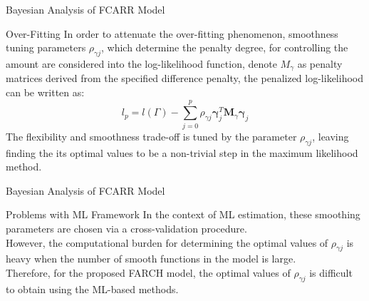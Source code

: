 \documentclass{beamer}
\begin{document}
\begin{frame}{Bayesian Analysis of FCARR Model}
\begin{block}{Over-Fitting}
In order to attenuate the over-fitting phenomenon, smoothness tuning parameters $\rho_{\gamma j}$, which determine the penalty degree, for controlling the amount are considered into the log-likelihood function, denote $M_{\gamma}$ as penalty matrices derived from the specified difference penalty, the penalized log-likelihood can be written as:
\begin{equation}
     l_p = l(\Gamma) - \sum_{j=0}^p \rho_{\gamma j} \bm{\gamma}_j^T \bm{M}_ \gamma \bm{\gamma}_j
\end{equation}
The flexibility and smoothness trade-off is tuned by the parameter $\rho_{\gamma j}$, leaving finding the its optimal values to be a non-trivial step in the maximum likelihood method.
\end{block}
\end{frame}

\begin{frame}{Bayesian Analysis of FCARR Model}
\begin{block}{Problems with ML Framework}
In the context of ML estimation, these smoothing parameters are chosen via a cross-validation procedure.\\
\vspace{18pt}
However, the computational burden for determining the optimal values of
$\rho_{\gamma j}$ is heavy when the number of smooth functions in the model is large.\\
\vspace{18pt}
Therefore, for the proposed FARCH model, the optimal values of $\rho_{\gamma j}$ is difficult to obtain using the ML-based methods.
\end{block}
\end{frame}
\end{document}
